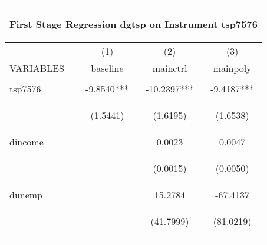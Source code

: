\begin{center}
\begin{tabular}{lccc}
\multicolumn{4}{c}{\begin{large}First Stage Regression dgtsp on Instrument tsp7576\end{large}} \\ \hline
 & (1) & (2) & (3) \\
VARIABLES & baseline & mainctrl & mainpoly \\ \hline
\vspace{4pt} & \begin{footnotesize}\end{footnotesize} & \begin{footnotesize}\end{footnotesize} & \begin{footnotesize}\end{footnotesize} \\
tsp7576 & -9.8540*** & -10.2397*** & -9.4187*** \\
\vspace{4pt} & \begin{footnotesize}(1.5441)\end{footnotesize} & \begin{footnotesize}(1.6195)\end{footnotesize} & \begin{footnotesize}(1.6538)\end{footnotesize} \\
dincome &  & 0.0023 & 0.0047 \\
\vspace{4pt} & \begin{footnotesize}\end{footnotesize} & \begin{footnotesize}(0.0015)\end{footnotesize} & \begin{footnotesize}(0.0050)\end{footnotesize} \\
dunemp &  & 15.2784 & -67.4137 \\
\vspace{4pt} & \begin{footnotesize}\end{footnotesize} & \begin{footnotesize}(41.7999)\end{footnotesize} & \begin{footnotesize}(81.0219)\end{footnotesize} \\

\end{tabular}
\end{center}
